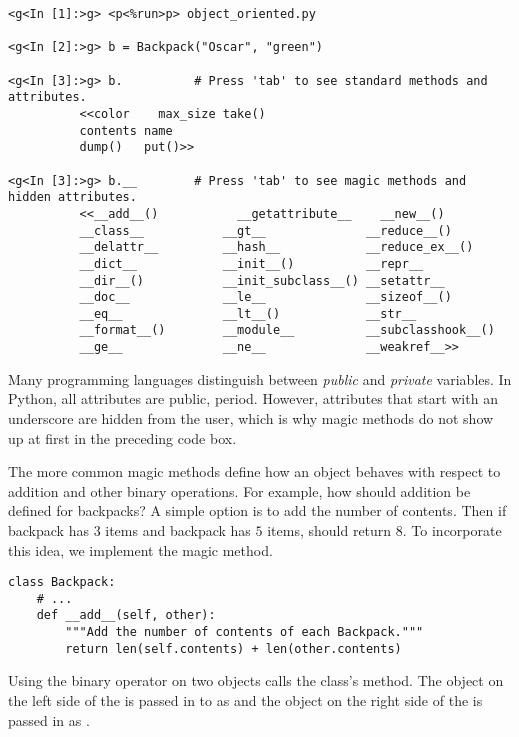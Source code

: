 \begin{lstlisting}
<g<In [1]:>g> <p<%run>p> object_oriented.py

<g<In [2]:>g> b = Backpack("Oscar", "green")

<g<In [3]:>g> b.          # Press 'tab' to see standard methods and attributes.
          <<color    max_size take()
          contents name
          dump()   put()>>

<g<In [3]:>g> b.__        # Press 'tab' to see magic methods and hidden attributes.
          <<__add__()           __getattribute__    __new__()
          __class__           __gt__              __reduce__()
          __delattr__         __hash__            __reduce_ex__()
          __dict__            __init__()          __repr__
          __dir__()           __init_subclass__() __setattr__
          __doc__             __le__              __sizeof__()
          __eq__              __lt__()            __str__
          __format__()        __module__          __subclasshook__()
          __ge__              __ne__              __weakref__>>
\end{lstlisting}

\begin{info}
Many programming languages distinguish between \emph{public} and \emph{private} variables.
In Python, all attributes are public, period.
However, attributes that start with an underscore are hidden from the user, which is why magic methods do not show up at first in the preceding code box.
\end{info}

The more common magic methods define how an object behaves with respect to addition and other binary operations.
For example, how should addition be defined for backpacks?
A simple option is to add the number of contents.
Then if backpack  has $3$ items and backpack  has $5$ items,  should return $8$.
To incorporate this idea, we implement the  magic method.

\begin{lstlisting}
class Backpack:
    # ...
    def __add__(self, other):
        """Add the number of contents of each Backpack."""
        return len(self.contents) + len(other.contents)
\end{lstlisting}

Using the \li{+} binary operator on two  objects calls the class's  method.
The object on the left side of the \li{+} is passed in to  as  and the object on the right side of the \li{+} is passed in as .

